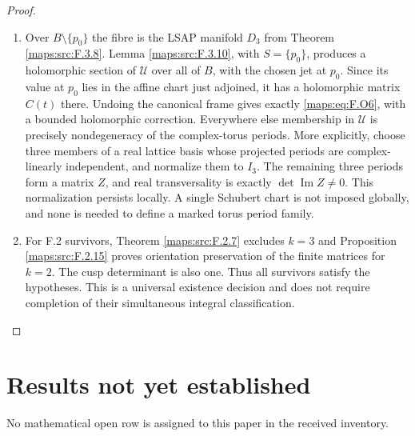 \begin{proof}
\begin{enumerate}[label=\arabic*.]
\item Over $B\setminus\{p_0\}$ the fibre is the LSAP manifold
$D_3$ from Theorem \ref{maps:src:F.3.8}.  Lemma \ref{maps:src:F.3.10}, with $S=\{p_0\}$,
produces a holomorphic section of $\mathscr U$ over all of
$B$, with the chosen jet at $p_0$.  Since its value at $p_0$
lies in the affine chart just adjoined, it has a holomorphic
matrix $C(t)$ there.  Undoing the canonical frame gives
exactly \eqref{maps:eq:F.O6}, with a bounded holomorphic correction.
Everywhere else membership in $\mathscr U$ is precisely
nondegeneracy of the complex-torus periods.
More explicitly, choose three members of a real lattice basis
whose projected periods are complex-linearly independent, and
normalize them to $I_3$.  The remaining three periods form a
matrix $Z$, and real transversality is exactly
$\det\operatorname{Im}Z\ne0$.  This normalization persists
locally.  A single Schubert chart is not imposed globally,
and none is needed to define a marked torus period family.

\item For F.2 survivors, Theorem \ref{maps:src:F.2.7} excludes $k=3$ and
Proposition \ref{maps:src:F.2.15} proves orientation preservation of the
finite matrices for $k=2$.  The cusp determinant is also one.
Thus all survivors satisfy the hypotheses.  This is a
universal existence decision and does not require completion
of their simultaneous integral classification.

\end{enumerate}
\end{proof}




\clearpage
\part{Results not yet established}
No mathematical open row is assigned to this paper in the received inventory.

